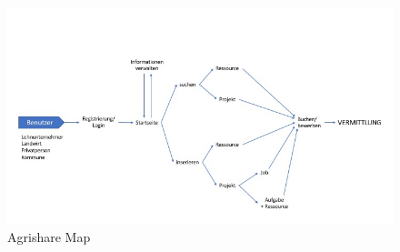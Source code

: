 %
%
\begin{figure}[h!]
	\includegraphics[width=\textwidth]{99_IMG/03_Sprint/map}
	\caption{Agrishare Map}
	\label{fig:map}
\end{figure}
%

